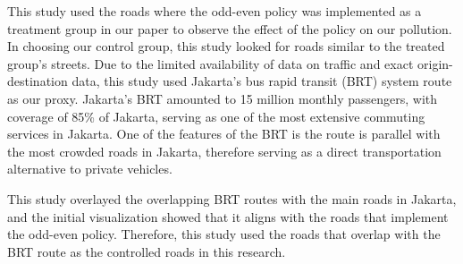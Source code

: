 \documentclass[AEJ]{AEA}
\begin{document}
This study used the roads where the odd-even policy was implemented as a treatment group in our paper to observe the effect of the policy on our pollution. In choosing our control group, this study looked for roads similar to the treated group's streets. Due to the limited availability of data on traffic and exact origin-destination data, this study used Jakarta's bus rapid transit (BRT) system route as our proxy. Jakarta's BRT amounted to 15 million monthly passengers, with coverage of 85\% of Jakarta, serving as one of the most extensive commuting services in  Jakarta. One of the features of the BRT is the route is parallel with the most crowded roads in Jakarta, therefore serving as a direct transportation alternative to private vehicles. 

This study overlayed the overlapping BRT routes with the main roads in Jakarta, and the initial visualization showed that it aligns with the roads that implement the odd-even policy. Therefore, this study used the roads that overlap with the BRT route as the controlled roads in this research.
\end{document}
